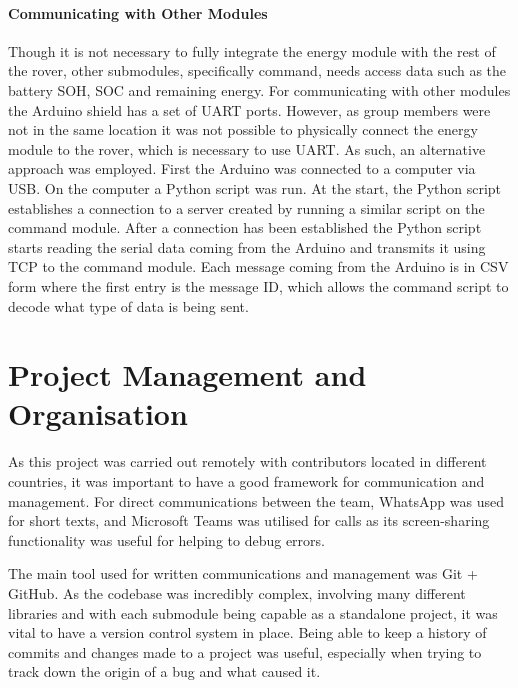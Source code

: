 \documentclass[a4paper]{article}
\begin{document}
\paragraph*{Communicating with Other Modules}
Though it is not necessary to fully integrate the energy module with 
the rest of the rover, other submodules, specifically command, needs 
access data such as the battery SOH, SOC and remaining energy. For 
communicating with other modules the Arduino shield has a set of 
UART ports. However, as group members were not in the same location 
it was not possible to physically connect the energy module to the 
rover, which is necessary to use UART. As such, an alternative 
approach was employed. First the Arduino was connected to a computer 
via USB. On the computer a Python script was run. At the start, the 
Python script establishes a connection to a server created by running 
a similar script on the command module. After a connection has been 
established the Python script starts reading the serial data coming 
from the Arduino and transmits it using TCP to the command module. 
Each message coming from the Arduino is in CSV form where the first 
entry is the message ID, which allows the command script to decode 
what type of data is being sent. 

\section{Project Management and Organisation}
As this project was carried out remotely
with contributors located in different countries, 
it was important to have a good framework for communication and management. 
For direct communications between the team, WhatsApp was used for short texts, 
and Microsoft Teams was utilised for calls as its screen-sharing functionality 
was useful for helping to debug errors. 

The main tool used for written communications and management was Git + GitHub.
As the codebase was incredibly complex, 
involving many different libraries and with each submodule being capable as a
standalone project, it was vital to have a version control system in place. 
Being able to keep a history of commits and changes made to a project was useful,
especially when trying to track down the origin of a bug and what caused it. 
\end{document}
